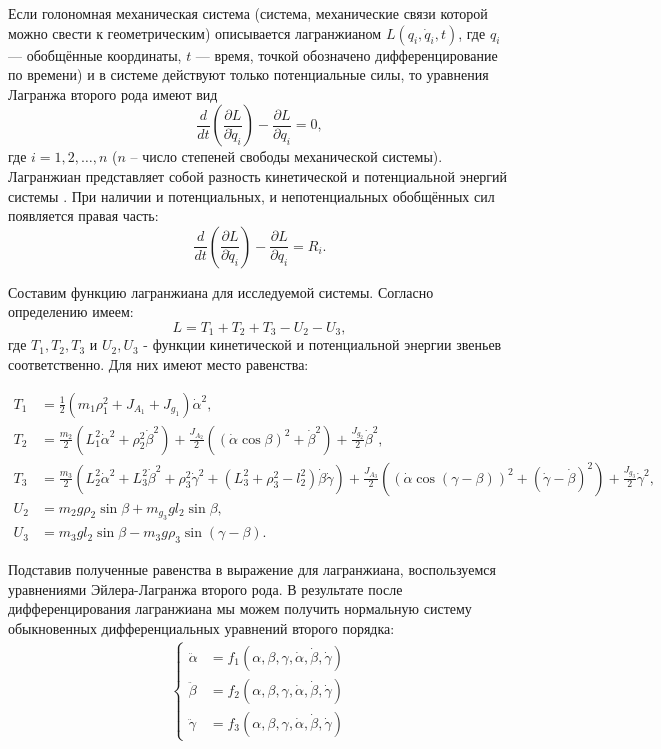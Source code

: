 \documentclass{article}
\begin{document}
Если голономная механическая система (система, механические связи которой можно свести к геометрическим) описывается лагранжианом $L(q_{i},{\dot {q}_{i}},t)$, где $q_{i}$ --- обобщённые координаты, $t$ --- время, точкой обозначено дифференцирование по времени) и в системе действуют только потенциальные силы, то уравнения Лагранжа второго рода имеют вид  \[{\frac {d}{dt}}\left({\frac {\partial L}{\partial {\dot {q}}_{i}}}\right)-{\frac {\partial L}{\partial q_{i}}}=0,\] где $i = 1,2,\ldots,n$ ($n$ -- число степеней свободы механической системы). Лагранжиан представляет собой разность кинетической и потенциальной энергий системы \cite{ref4}.
При наличии и потенциальных, и непотенциальных обобщённых сил появляется правая часть: \[\frac{d}{dt} \left( \frac{\partial L}{\partial\dot q_i} \right) - \frac{\partial L}{\partial q_i} = R_i .\]

Составим функцию лагранжиана для исследуемой системы. Согласно определению имеем:
\[L = T_1 + T_2 + T_3 - U_2 - U_3,\] где $T_1, T_2, T_3$ и $U_2, U_3$ - функции кинетической и потенциальной энергии звеньев соответственно. Для них имеют место равенства:

\begin{align*}
T_1 &= \frac{1}{2} (m_1\rho_1^2 + J_{A_1} + J_{g_1}) \dot\alpha^2,\\
T_2 &= \frac{m_2}{2}(L_1^2\dot\alpha^2+\rho_2^2\dot\beta^2) + \frac{J_{A_2}}{2}((\dot\alpha\cos{\beta})^2+\dot\beta^2) + \frac{J_{g_2}}{2}\dot\beta^2,\\
T_3 &= \frac{m_3}{2}(L_2^2\dot\alpha^2+L_3^2\dot\beta^2+\rho_3^2\dot\gamma^2+(L_3^2+\rho_3^2-l_2^2)\dot\beta\dot\gamma) + \frac{J_{A_3}}{2}((\dot\alpha\cos{(\gamma - \beta)})^2 + (\dot\gamma-\dot\beta)^2) + \frac{J_{g_3}}{2}\dot\gamma^2,\\
U_2 &= m_2g\rho_2\sin{\beta} + m_{g_3}gl_2\sin{\beta},\\
U_3 &= m_3gl_2\sin{\beta}-m_3g\rho_3\sin{(\gamma-\beta)}.
\end{align*}

Подставив полученные равенства в выражение для лагранжиана, воспользуемся уравнениями Эйлера-Лагранжа второго рода. В результате после дифференцирования лагранжиана мы можем получить нормальную систему обыкновенных дифференциальных уравнений второго порядка:
\begin{align*}
\begin{cases}
\ddot\alpha &= f_1(\alpha,\beta,\gamma,\dot\alpha,\dot\beta,\dot\gamma)\\
\ddot\beta &= f_2(\alpha,\beta,\gamma,\dot\alpha,\dot\beta,\dot\gamma)\\
\ddot\gamma &= f_3(\alpha,\beta,\gamma,\dot\alpha,\dot\beta,\dot\gamma)
\end{cases}
\end{align*}
\end{document}
